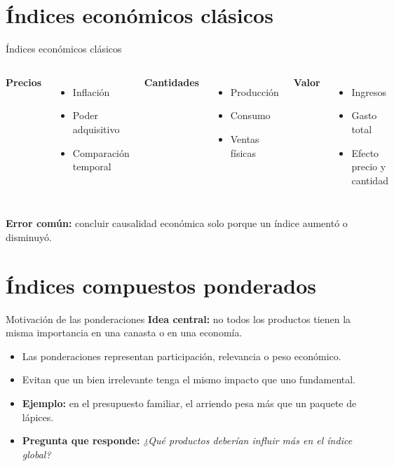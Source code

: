 \documentclass[aspectratio=169,11pt]{beamer}
\newcommand{\pregunta}[1]{\textbf{Pregunta que responde:} \emph{#1}}
\newcommand{\errorcomun}[1]{\textbf{Error común:} #1}
\begin{document}
\section{Índices económicos clásicos}

\begin{frame}{Índices económicos clásicos}
\begin{columns}[T]
\textbf{Precios}
\begin{itemize}
  \item Inflación
  \item Poder adquisitivo
  \item Comparación temporal
\end{itemize}
\textbf{Cantidades}
\begin{itemize}
  \item Producción
  \item Consumo
  \item Ventas físicas
\end{itemize}
\textbf{Valor}
\begin{itemize}
  \item Ingresos
  \item Gasto total
  \item Efecto precio y cantidad
\end{itemize}
\end{columns}
\vspace{0.5em}
\errorcomun{concluir causalidad económica solo porque un índice aumentó o disminuyó.}
\end{frame}

\section{Índices compuestos ponderados}

\begin{frame}{Motivación de las ponderaciones}
\textbf{Idea central:} no todos los productos tienen la misma importancia en una canasta o en una economía.
\begin{itemize}
  \item Las ponderaciones representan participación, relevancia o peso económico.
  \item Evitan que un bien irrelevante tenga el mismo impacto que uno fundamental.
  \item \textbf{Ejemplo:} en el presupuesto familiar, el arriendo pesa más que un paquete de lápices.
  \item \pregunta{¿Qué productos deberían influir más en el índice global?}
\end{itemize}
\end{frame}
\end{document}
